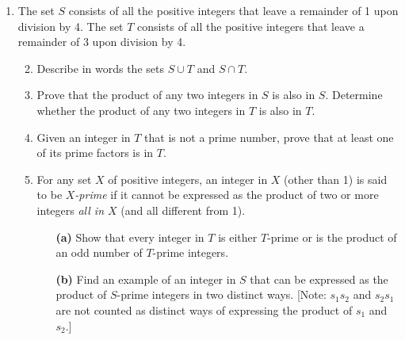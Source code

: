 \documentclass[a4, 11pt]{report}
\newlength{\qspace}
\newcounter{qnumber}
\newenvironment{question}%
 {\vspace{\qspace}
  \begin{enumerate}[\bfseries 1\quad][10]%
    \setcounter{enumi}{\value{qnumber}}%
    \item%
 }
{
  \end{enumerate}
  \filbreak
  \stepcounter{qnumber}
 }
\newenvironment{questionparts}[1][1]%
 {
  \begin{enumerate}[\bfseries (i)]%
    \setcounter{enumii}{#1}
    \addtocounter{enumii}{-1}
    \setlength{\itemsep}{5mm}
    \setlength{\parskip}{8pt}
 }
 {
  \end{enumerate}
 }
\begin{document}
\begin{question}
The set $S$
consists of all the 
positive integers that leave a remainder of 1 upon division by 4.
The set $T$
consists of all the 
positive integers that leave a remainder of 3 upon division by 4.




\begin{questionparts}
\item 
Describe in words the sets 
$S \cup T$  and  $S \cap T$.


\item Prove that the product of any two integers in $S$ is also in $S$.
Determine whether the product of any two integers in $T$
is also in  $T$.

\item
 Given an integer in $T$ that is not a prime number, 
prove that at least one of its prime factors is in $T$.

\item  
For any set $X$ of positive integers,
 an integer in  $X$ (other than 1) is said to be 
{\em $X$-prime} if it cannot be expressed as the product of
two or more integers {\em all in $X$} (and all different from 1).

\begin{itemize}
\item[\bf (a)] Show that every integer  in $T$  is 
either  $T$-prime or  is the  product of an odd number of 
$T$-prime integers.

\item[\bf (b)] Find an 
example of an integer in $S$ that can be expressed as the product
of  \hbox{$S$-prime} integers in two distinct ways. [Note: 
 $s_1s_2$ and $s_2s_1$ are not counted as distinct ways of 
expressing the product of $s_1$ and $s_2$.]
\end{itemize}
\end{questionparts}

 
\end{question}
\end{document}
